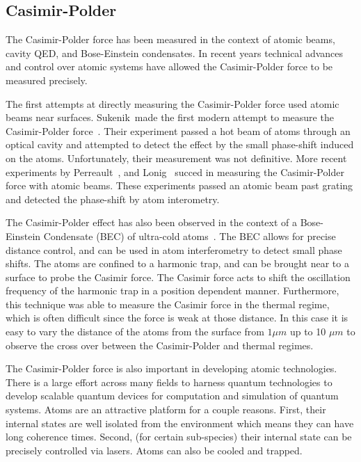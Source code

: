 \subsection{Casimir-Polder}
The Casimir-Polder force has been measured in the context of atomic beams, cavity QED, and 
Bose-Einstein condensates.  
In recent years technical advances and control over atomic systems have allowed the Casimir-Polder
force to be measured precisely.  

    The first attempts at directly measuring the Casimir-Polder force used atomic beams 
    near surfaces.  
    Sukenik~\etal made the first modern attempt to measure the Casimir-Polder force~\cite{Sukenik1993}.
    Their experiment passed a hot beam of atoms through an optical cavity and attempted to detect
    the effect by the small phase-shift induced on the atoms.  Unfortunately, their measurement 
    was not definitive.
    More recent experiments by Perreault~\etal\cite{Perreault2005}, and Lonig~\etal\cite{Lonij2009} succed in measuring
    the Casimir-Polder force with atomic beams.  These experiments passed an atomic beam past grating and 
    detected the phase-shift by atom interometry.  %

    The Casimir-Polder effect has also been observed in the context of a Bose-Einstein Condensate (BEC)
    of ultra-cold atoms~\cite{Harber2005,Obrecht2007}.  The BEC allows for precise distance control,
    and can be used in atom interferometry to detect small phase shifts.    
    The atoms are confined to a harmonic trap, and can be brought near to a surface to probe the Casimir
    force.  The Casimir force acts to shift the oscillation frequency of the harmonic trap in a position
    dependent manner.  
    Furthermore, this technique was able to measure the Casimir force in the thermal regime, which
    is often difficult since the force is weak at those distance.  In this case it is easy to 
    vary the distance of the atoms from the surface from $1\mu m$ up to 10 $\mu m$ to observe
    the cross over between the Casimir-Polder and thermal regimes.

The Casimir-Polder force is also important in developing atomic technologies.  
There is a large effort across many fields to harness quantum technologies to develop scalable 
quantum devices for computation and simulation of quantum systems.  
Atoms are an attractive platform for a couple reasons.  
First, their internal states are well isolated from the environment which means they can have long coherence times.
Second, (for certain sub-species) their internal state can be precisely controlled via lasers.  
Atoms can also be cooled and trapped.  

